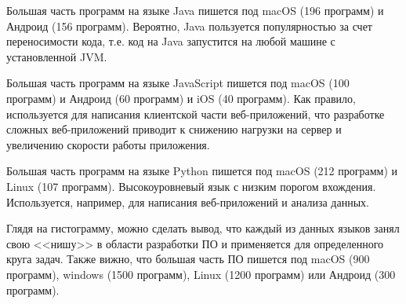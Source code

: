 Большая часть программ на языке Java пишется под macOS (196 программ) и Андроид (156 программ). Вероятно, Java пользуется популярностью за счет переносимости кода, т.е. код на Java запустится на любой машине с установленной JVM.

Большая часть программ на языке JavaScript пишется под macOS (100 программ) и Андроид (60 программ) и iOS (40 программ). Как правило, используется для написания клиентской части веб-приложений, что разработке сложных веб-приложений приводит к снижению нагрузки на сервер и увеличению скорости работы приложения.

Большая часть программ на языке Python пишется под macOS (212 программ) и Linux (107 программ). Высокоуровневый язык с низким порогом вхождения. Используется, например, для написания веб-приложений и анализа данных.

Глядя на гистограмму, можно сделать вывод, что каждый из данных языков занял свою <<нишу>> в области разработки ПО и применяется для определенного круга задач. Также вижно, что большая часть ПО пишется под macOS (900 программ), windows (1500 программ), Linux (1200 программ) или Андроид (300 программ).